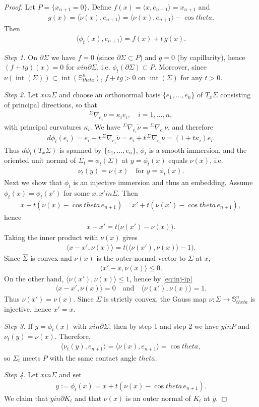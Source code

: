 \documentclass[12pt]{amsart}
\def\theta{theta}%
\def\in{in }%
\numberwithin{equation}{section}
\newcommand{\wh}{\widehat}
\newcommand{\bbS}{\mathbb{S}}
\newcommand{\op}[1]{\operatorname{#1}}
\newcommand{\8}{\infty}
\newcommand{\Si}{\Sigma}
\newcommand{\ip}[2]{\langle #1,#2 \rangle}
\newcommand{\eq}[1]{\begin{equation}\begin{alignedat}{2}#1\end{alignedat}\end{equation}}
\begin{document}
\begin{proof}
Let $P=\{x_{n+1}=0\}$. Define $f(x)=\langle x,e_{n+1}\rangle=x_{n+1}$ and
\eq{
  g(x)=\langle \tilde\nu(x),e_{n+1}\rangle
       =\langle \nu(x),e_{n+1}\rangle-\cos\theta.
}
Then
\eq{\label{eq:height-after-shift}
  \langle \phi_t(x),e_{n+1}\rangle = f(x)+t\,g(x).
}   

\emph{Step 1.}
On $\partial\Sigma$ we have $f=0$ (since $\partial\Sigma\subset P$) and $g=0$ (by capillarity),
hence $(f+tg)(x)=0$ for $x\in\partial\Sigma$, i.e. $\phi_t(\partial\Sigma)\subset P$. Moreover, since $\nu(\op{int}(\Si))\subset \op{int}(\bbS^n_{\theta})$, $f+t g>0$ on $\op{int}(\Sigma)$ for any $t>0$. 

\emph{Step 2.}
Let $x\in\Sigma$ and choose an orthonormal basis $\{e_1,\dots,e_n\}$ of $T_x\Sigma$
consisting of principal directions, so that
\eq{
  {}^{\Si}\nabla_{e_i}\nu=\kappa_i e_i,\quad i=1,\dots,n,
}
with principal curvatures $\kappa_i$.
We have ${}^{\Si}\nabla_{e_i}\tilde\nu={}^{\Si}\nabla_{e_i}\nu$, and therefore
\eq{
  d\phi_t(e_i)=e_i+t\,{}^{\Si}\nabla_{e_i}\tilde\nu
  =e_i+t\,{}^{\Si}\nabla_{e_i}\nu
  =(1+t\kappa_i)e_i.
}
Thus $d\phi_t(T_x\Sigma)$ is spanned by $\{e_1,\dots,e_n\}$, $\phi_t$ is a smooth immersion, and the oriented unit normal of $\Sigma_t=\phi_t(\Sigma)$
at $y=\phi_t(x)$ equals $\nu(x)$, i.e.
\eq{
  \nu_t(y)=\nu(x)\quad\text{for }y=\phi_t(x).
}
Next we show that $\phi_t$ is an injective immersion and thus an embedding. Assume $\phi_t(x)=\phi_t(x')$ for some
$x,x'\in\Sigma$. Then
\eq{
  x+t(\nu(x)-\cos\theta\,e_{n+1})=x'+t(\nu(x')-\cos\theta\,e_{n+1}),
}
hence
\eq{\label{eq:inj-start}
  x-x'=t\bigl(\nu(x')-\nu(x)\bigr).
}
Taking the inner product with $\nu(x)$ gives
\eq{\label{eq:inj-ip}
  \ip{x-x'}{\nu(x)}=t\bigl(\ip{\nu(x')}{\nu(x)}-1\bigr).
}
Since $\wh{\Si}$ is convex and $\nu(x)$ is the outer normal vector to $\Si$ at $x$,
\eq{
  \ip{x'-x}{\nu(x)}\le 0.
}
On the other hand, $\ip{\nu(x')}{\nu(x)}\le 1$, hence by \eqref{eq:inj-ip}
\eq{
  \ip{x-x'}{\nu(x)}=0
  \quad\text{and}\quad
  \ip{\nu(x')}{\nu(x)}=1.
}
Thus $\nu(x')=\nu(x)$. Since $\Sigma$ is strictly convex, the Gauss map
$\nu:\Sigma\to\bbS_{\theta}^n$ is injective, hence $x'=x$.

\emph{Step 3.}
If $y=\phi_t(x)$ with $x\in\partial\Sigma$, then by step 1 and step 2 we have $y\in P$ and
$\nu_t(y)=\nu(x)$. Therefore,
\eq{
  \langle \nu_t(y),e_{n+1}\rangle
  = \langle \nu(x),e_{n+1}\rangle
  = \cos\theta,
}
so $\Sigma_t$ meets $P$ with the same contact angle $\theta$.


\emph{Step 4.}
Let $x\in\Sigma$ and set
\eq{
y:=\phi_t(x)=x+t(\nu(x)-\cos\theta\,e_{n+1}).
}
We claim that $y\in\partial K_t$ and that $\nu(x)$ is an outer normal of $K_t$ at $y$.


\end{proof}
\end{document}
